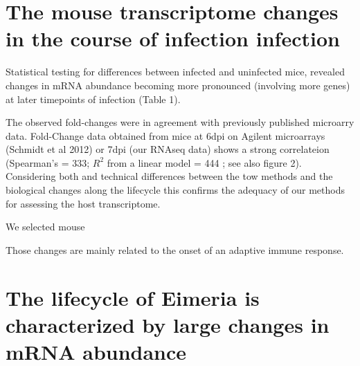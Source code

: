\documentclass{bmcart}
\begin{document}
\section*{The mouse transcriptome changes in the course of infection infection}

Statistical testing for differences between infected and uninfected
mice, revealed changes in mRNA abundance becoming more pronounced
(involving more genes) at later timepoints of infection (Table 1).

The observed fold-changes were in agreement with previously published
microarry data. Fold-Change data obtained from mice at 6dpi on Agilent
microarrays (Schmidt et al 2012) or 7dpi (our RNAseq data) shows a
strong correlateion (Spearman's \rho = 333; $R^2$ from a linear model
= 444 ; see also figure 2). Considering both and technical differences
between the tow methods and the biological changes along the lifecycle
this confirms the adequacy of our methods for assessing the host
transcriptome.

We selected mouse




Those changes are mainly related to the onset of an
adaptive immune response.




\section*{The lifecycle of Eimeria is characterized by large changes in mRNA abundance}


\end{document}

